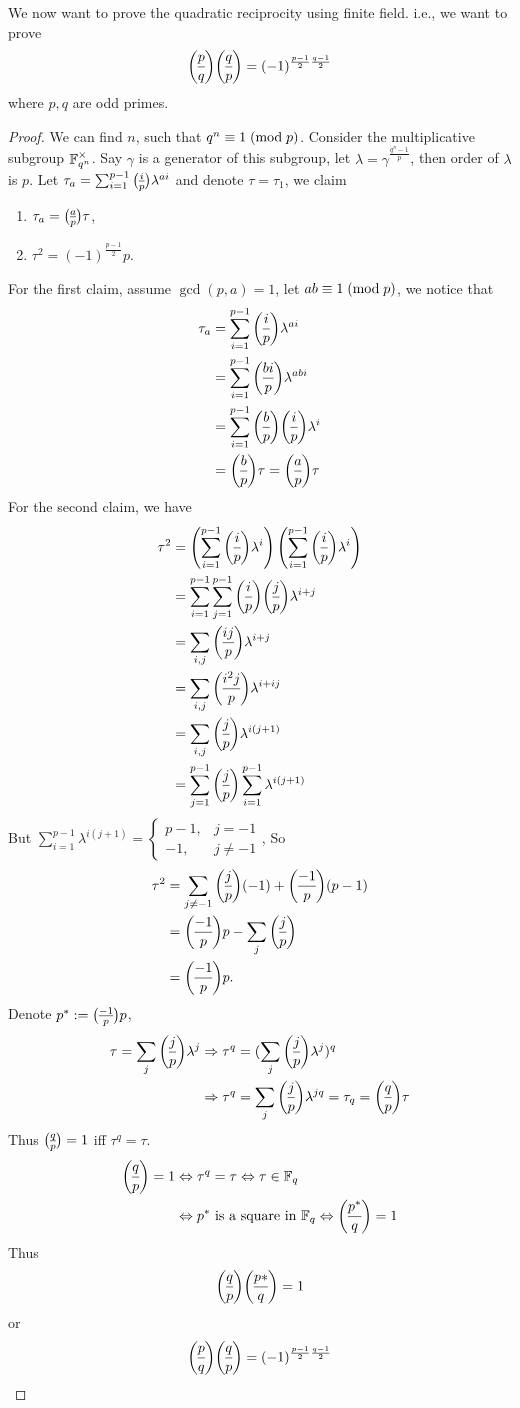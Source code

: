 We now want to prove the quadratic reciprocity using finite field. i.e., we want to prove
$$\leg{p}{q}\leg{q}{p}=(-1)^{\frac{p-1}{2}\frac{q-1}{2}}$$
where $p,q$ are odd primes.
\begin{proof}
We can find $n$, such that $q^n\equiv 1\;(\mbox{mod}{\;p})$. Consider the multiplicative subgroup $\mathbb{F}_{q^n}^\times$. Say $\gamma$ is a generator of this subgroup, let $\lambda = \gamma^{\frac{q^n-1}{p}}$, then order of $\lambda$ is $p$. Let $\tau_a = \sum_{i=1}^{p-1}\leg{i}{p}\lambda^{ai}$ and denote $\tau = \tau_1$, we claim
\begin{enumerate}
\item
$\tau_a=\leg{a}{p}\tau$,
\item
$\tau^2 = (-1)^{\frac{p-1}{2}}p$.
\end{enumerate}
For the first claim, assume $\gcd(p,a)=1$, let $ab\equiv 1\;(\mbox{mod}{\;p})$, we notice that 
\begin{align*}
\tau_a &= \sum_{i=1}^{p-1}\leg{i}{p}\lambda^{ai}\\
&= \sum_{i=1}^{p-1}\leg{bi}{p}\lambda^{abi}\\
&= \sum_{i=1}^{p-1}\leg{b}{p}\leg{i}{p}\lambda^{i}\\
&= \leg{b}{p} \tau = \leg{a}{p} \tau
\end{align*}
For the second claim, we have 
\begin{align*}
\tau^2 &= \left(\sum_{i=1}^{p-1}\leg{i}{p}\lambda^{i} \right)\left(\sum_{i=1}^{p-1}\leg{i}{p}\lambda^{i} \right)\\
&= \sum_{i=1}^{p-1}\sum_{j=1}^{p-1}\leg{i}{p}\leg{j}{p}\lambda^{i+j}\\
&= \sum_{i,j}\leg{ij}{p}\lambda^{i+j}\\
&= \sum_{i,j}\leg{i^2j}{p}\lambda^{i+ij}\\
&= \sum_{i,j}\leg{j}{p}\lambda^{i(j+1)}\\
&= \sum_{j=1}^{p-1} \leg{j}{p}\sum_{i=1}^{p-1}\lambda^{i(j+1)}
\end{align*}
But $\sum_{i=1}^{p-1}\lambda^{i(j+1)}=\left\{\begin{matrix}
p-1, & j=-1\\ -1, & j\ne-1\end{matrix}\right.$, So \begin{align*}
\tau^2 &=\sum_{j\ne-1}\leg{j}{p}(-1)+\leg{-1}{p}(p-1)\\
&=\leg{-1}{p}p-\sum_{j}\leg{j}{p}\\
&=\leg{-1}{p}p.
\end{align*}
Denote $p^*:=\leg{-1}{p}p$,
\begin{align*}
\tau=\sum_j\leg{j}{p}\lambda^j & \Rightarrow \tau^q=(\sum_j\leg{j}{p}\lambda^j)^q\\
& \Rightarrow \tau^q = \sum_{j}\leg{j}{p}\lambda^{jq} = \tau_q = \leg{q}{p}\tau
\end{align*}
Thus $\leg{q}{p}=1$ iff $\tau^q=\tau$.
\begin{align*}
\leg{q}{p}=1 & \Leftrightarrow \tau^q=\tau \Leftrightarrow \tau\in\F_q\\
& \Leftrightarrow p^*\mbox{ is a square in } \F_q \Leftrightarrow \leg{p^*}{q}=1
\end{align*}
Thus $$\leg{q}{p}\leg{p*}{q}=1$$
or $$\leg{p}{q}\leg{q}{p}=(-1)^{\frac{p-1}{2}\frac{q-1}{2}}$$
\end{proof}